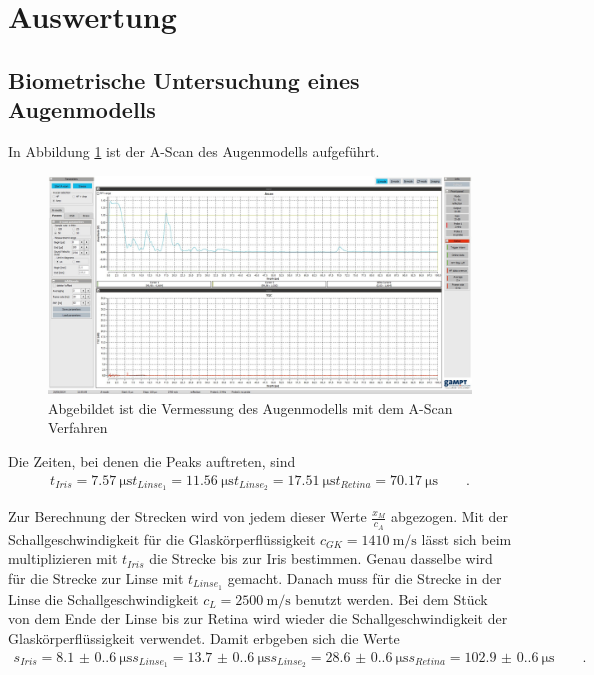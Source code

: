 \section{Auswertung}
\label{sec:Auswertung}


\subsection{Biometrische Untersuchung eines Augenmodells}

In Abbildung \ref{fig:Auge} ist der A-Scan des Augenmodells aufgeführt.
\begin{figure}
  \centering
  \includegraphics[width=\textwidth]{Bilder/Auge1.jpg}
  \caption{Abgebildet ist die Vermessung des Augenmodells mit dem A-Scan Verfahren}
  \label{fig:Auge}
\end{figure}

Die Zeiten, bei denen die Peaks auftreten, sind
\begin{gather*}
  t_{Iris}=   \qty{7.57}{\micro\second}
  t_{Linse_1}=\qty{11.56}{\micro\second}
  t_{Linse_2}=\qty{17.51}{\micro\second}
  t_{Retina}= \qty{70.17}{\micro\second} \qquad .
\end{gather*}

\noindent Zur Berechnung der Strecken wird von jedem dieser Werte $\frac{x_M}{c_A}$ abgezogen.
Mit der Schallgeschwindigkeit für die Glaskörperflüssigkeit $c_{GK}=\qty{1410}{\meter\per\second}$ lässt sich beim multiplizieren mit $t_{Iris}$ die Strecke bis zur Iris bestimmen.
Genau dasselbe wird für die Strecke zur Linse mit $t_{Linse_1}$ gemacht.
Danach muss für die Strecke in der Linse die Schallgeschwindigkeit $c_L=\qty{2500}{\meter\per\second}$ benutzt werden.
Bei dem Stück von dem Ende der Linse bis zur Retina wird wieder die Schallgeschwindigkeit der Glaskörperflüssigkeit verwendet.
Damit erbgeben sich die Werte
\begin{gather*}
  s_{Iris}=     \qty{8.1(0.6)}{\micro\second}
  s_{Linse_1}= \qty{13.7(0.6)}{\micro\second}
  s_{Linse_2}= \qty{28.6(0.6)}{\micro\second}
  s_{Retina}= \qty{102.9(0.6)}{\micro\second} \qquad .
\end{gather*}



